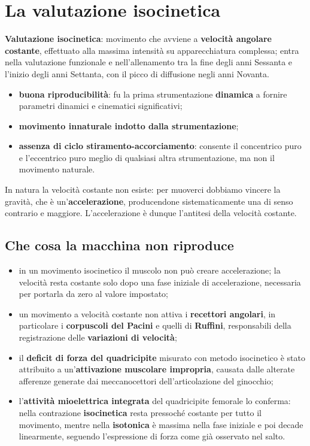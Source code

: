 \section{La valutazione isocinetica}

\textbf{Valutazione isocinetica}: movimento che avviene a \textbf{velocità angolare costante},
  effettuato alla massima intensità su apparecchiatura complessa; entra nella valutazione funzionale
  e nell'allenamento tra la fine degli anni Sessanta e l'inizio degli anni Settanta, con il picco di
  diffusione negli anni Novanta.

\begin{itemize}
  \item \textbf{buona riproducibilità}: fu la prima strumentazione \textbf{dinamica} a fornire
    parametri dinamici e cinematici significativi;
  \item \textbf{movimento innaturale indotto dalla strumentazione};
  \item \textbf{assenza di ciclo stiramento-accorciamento}: consente il concentrico puro e
    l'eccentrico puro meglio di qualsiasi altra strumentazione, ma non il movimento naturale.
\end{itemize}

In natura la velocità costante non esiste: per muoverci dobbiamo vincere la gravità, che è
un'\textbf{accelerazione}, producendone sistematicamente una di senso contrario e maggiore.
L'accelerazione è dunque l'antitesi della velocità costante.

\subsection{Che cosa la macchina non riproduce}

\begin{itemize}
  \item in un movimento isocinetico il muscolo non può creare accelerazione; la velocità
    resta costante solo dopo una fase iniziale di accelerazione, necessaria per portarla
    da zero al valore impostato;
  \item un movimento a velocità costante non attiva i \textbf{recettori angolari}, in particolare i
    \textbf{corpuscoli del Pacini} e quelli di \textbf{Ruffini}, responsabili della registrazione
    delle \textbf{variazioni di velocità};
  \item il \textbf{deficit di forza del quadricipite} misurato con metodo isocinetico è stato
    attribuito a un'\textbf{attivazione muscolare impropria}, causata dalle alterate afferenze
    generate dai meccanocettori dell'articolazione del ginocchio;
  \item l'\textbf{attività mioelettrica integrata} del quadricipite femorale lo conferma: nella
    contrazione \textbf{isocinetica} resta pressoché costante per tutto il movimento, mentre nella
    \textbf{isotonica} è massima nella fase iniziale e poi decade linearmente, seguendo
    l'espressione di forza come già osservato nel salto.
\end{itemize}

